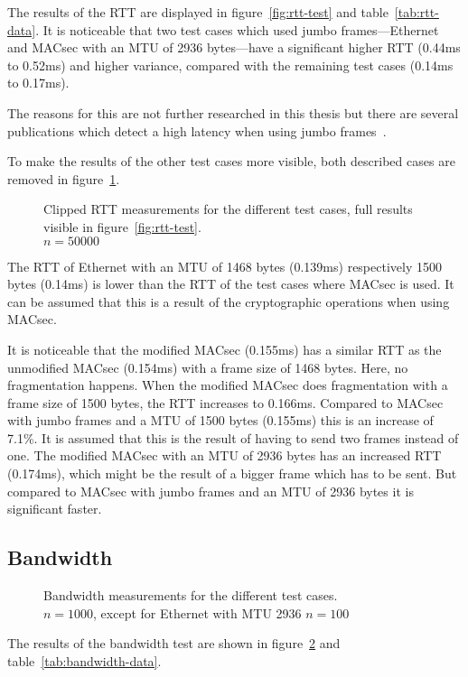 The results of the \gls{RTT} are displayed in figure~\ref{fig:rtt-test} and table~\ref{tab:rtt-data}.
It is noticeable that two test cases which used jumbo frames---Ethernet and \gls{MACsec} with an \gls{MTU} of 2936 bytes---have a significant higher \gls{RTT} (0.44ms to 0.52ms) and higher variance, compared with the remaining test cases (0.14ms to 0.17ms).

The reasons for this are not further researched in this thesis but there are several publications which detect a high latency when using jumbo frames~\cite{chelseajumbo}.

To make the results of the other test cases more visible, both described cases are removed in figure~\ref{fig:rtt-test-zoom}.
\begin{figure}
    \centering
    \def\svgwidth{\columnwidth}
    
    \caption[\acrlong{RTT} experiment (clipped)]{Clipped \gls{RTT} measurements for the different test cases, full results visible in figure~\ref{fig:rtt-test}.\\$n=50000$}
    \label{fig:rtt-test-zoom}
\end{figure}

The \gls{RTT} of Ethernet with an \gls{MTU} of 1468 bytes (0.139ms) respectively 1500 bytes (0.14ms) is lower than the \gls{RTT} of the test cases where \gls{MACsec} is used.
It can be assumed that this is a result of the cryptographic operations when using \gls{MACsec}.

It is noticeable that the modified \gls{MACsec} (0.155ms) has a similar \gls{RTT} as the unmodified \gls{MACsec} (0.154ms) with a frame size of 1468 bytes.
Here, no fragmentation happens.
When the modified \gls{MACsec} does fragmentation with a frame size of 1500 bytes, the \gls{RTT} increases to 0.166ms.
Compared to \gls{MACsec} with jumbo frames and a \gls{MTU} of 1500 bytes (0.155ms) this is an increase of 7.1\%.
It is assumed that this is the result of having to send two frames instead of one.
The modified \gls{MACsec} with an \gls{MTU} of 2936 bytes has an increased \gls{RTT} (0.174ms), which might be the result of a bigger frame which has to be sent.
But compared to \gls{MACsec} with jumbo frames and an \gls{MTU} of 2936 bytes it is significant faster.

\subsection{Bandwidth}
\label{sec:bandwidth-eva}
\begin{figure}
    \centering
    \def\svgwidth{\columnwidth}
    
    \caption[Bandwidth experiment bar chart]{Bandwidth measurements for the different test cases.\\$n=1000$, except for Ethernet with MTU 2936 $n=100$}
    \label{fig:bandwidth-test}
\end{figure}
The results of the bandwidth test are shown in figure~\ref{fig:bandwidth-test} and table~\ref{tab:bandwidth-data}.

